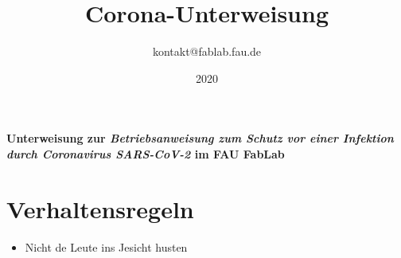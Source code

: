 \documentclass[13pt]{\basedir/fablab-document}
\date{2020}
\author{kontakt@fablab.fau.de}
\title{Corona-Unterweisung}
\begin{document}
\maketitle

\begin{center}
  \textbf{Unterweisung zur \emph{Betriebsanweisung zum Schutz vor einer Infektion durch Coronavirus SARS-CoV-2} im FAU FabLab}
\end{center}

\vbox{\vspace{1cm}}


\section{Verhaltensregeln}
\begin{itemize}
  \item  Nicht de Leute ins Jesicht husten
\end{itemize}

\end{document}
